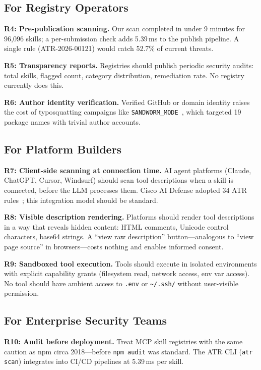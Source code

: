 \documentclass[letterpaper,twocolumn,10pt]{article}
\begin{document}
\subsection{For Registry Operators}

\textbf{R4: Pre-publication scanning.}  Our scan completed in under 9
minutes for 96,096 skills; a per-submission check adds 5.39\,ms to the
publish pipeline.  A single rule (ATR-2026-00121) would catch 52.7\% of
current threats.

\textbf{R5: Transparency reports.}  Registries should publish periodic
security audits: total skills, flagged count, category distribution,
remediation rate.  No registry currently does this.

\textbf{R6: Author identity verification.}  Verified GitHub or domain
identity raises the cost of typosquatting campaigns like
\texttt{SANDWORM\_MODE}~\cite{sandworm}, which targeted 19 package names
with trivial author accounts.

\subsection{For Platform Builders}

\textbf{R7: Client-side scanning at connection time.}  AI agent
platforms (Claude, ChatGPT, Cursor, Windsurf) should scan tool
descriptions when a skill is connected, before the LLM processes them.
Cisco AI Defense adopted 34 ATR rules~\cite{cisco79}; this integration
model should be standard.

\textbf{R8: Visible description rendering.}  Platforms should render
tool descriptions in a way that reveals hidden content: HTML comments,
Unicode control characters, base64 strings.  A ``view raw description''
button---analogous to ``view page source'' in browsers---costs nothing
and enables informed consent.

\textbf{R9: Sandboxed tool execution.}  Tools should execute in isolated
environments with explicit capability grants (filesystem read, network
access, env var access).  No tool should have ambient access to
\texttt{.env} or \texttt{\~{}/.ssh/} without user-visible permission.

\subsection{For Enterprise Security Teams}

\textbf{R10: Audit before deployment.}  Treat MCP skill registries with
the same caution as npm circa 2018---before \texttt{npm audit} was
standard.  The ATR CLI (\texttt{atr scan}) integrates into CI/CD
pipelines at 5.39\,ms per skill.
\end{document}
